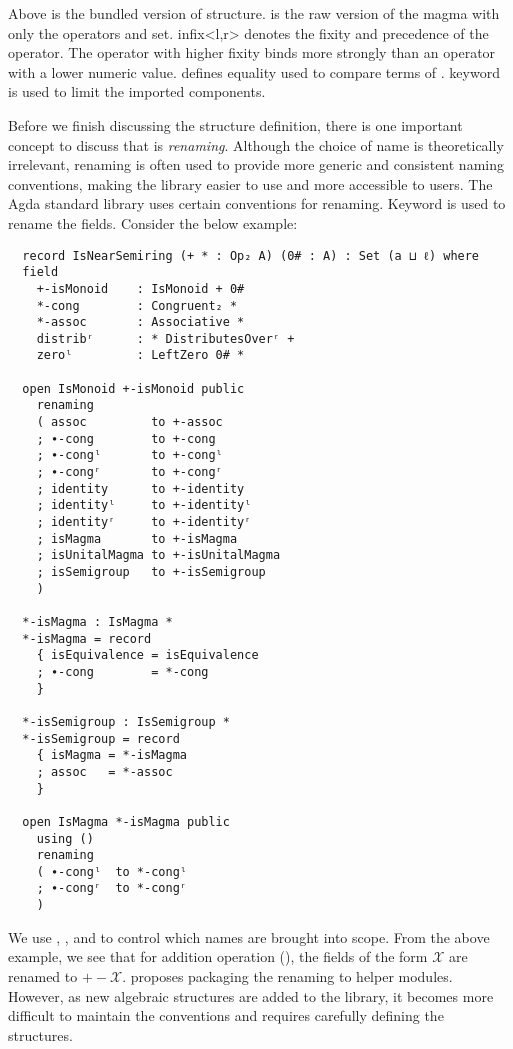 Above is the bundled version of  structure.  is
the raw version of the magma with only the operators and set. infix<l,r> denotes
the fixity and precedence of the operator. The operator with higher fixity binds
more strongly than an operator with a lower numeric value.  defines
equality used to compare terms of .  keyword is used
to limit the imported components. 

Before we finish discussing the structure definition, there is one important
concept to discuss that is \emph{renaming}. Although the choice of name is
theoretically irrelevant, renaming is often used to provide more generic and
consistent naming conventions, making the library easier to use and more
accessible to users. The Agda standard library uses certain conventions for
renaming. Keyword  is used to rename the fields. Consider the
below example:

\label{code:rename}
\begin{verbatim}
  record IsNearSemiring (+ * : Op₂ A) (0# : A) : Set (a ⊔ ℓ) where
  field
    +-isMonoid    : IsMonoid + 0#
    *-cong        : Congruent₂ *
    *-assoc       : Associative *
    distribʳ      : * DistributesOverʳ +
    zeroˡ         : LeftZero 0# *

  open IsMonoid +-isMonoid public
    renaming
    ( assoc         to +-assoc
    ; ∙-cong        to +-cong
    ; ∙-congˡ       to +-congˡ
    ; ∙-congʳ       to +-congʳ
    ; identity      to +-identity
    ; identityˡ     to +-identityˡ
    ; identityʳ     to +-identityʳ
    ; isMagma       to +-isMagma
    ; isUnitalMagma to +-isUnitalMagma
    ; isSemigroup   to +-isSemigroup
    )

  *-isMagma : IsMagma *
  *-isMagma = record
    { isEquivalence = isEquivalence
    ; ∙-cong        = *-cong
    }

  *-isSemigroup : IsSemigroup *
  *-isSemigroup = record
    { isMagma = *-isMagma
    ; assoc   = *-assoc
    }

  open IsMagma *-isMagma public
    using ()
    renaming
    ( ∙-congˡ  to *-congˡ
    ; ∙-congʳ  to *-congʳ
    )
\end{verbatim} 
We use , , and  to control which
names are brought into scope. From the above example, we see that for addition
operation (\inline{+}), the fields of the form $\mathscr{X}$ are renamed to
$+-\mathscr{X}$. \cite{musa} proposes packaging the renaming to helper modules.
However, as new algebraic structures are added to the library, it becomes
more difficult to maintain the conventions and requires carefully defining the
structures.  

